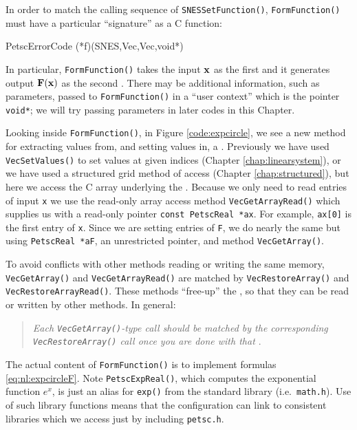 In order to match the calling sequence of \texttt{SNESSetFunction()}, \texttt{FormFunction()} must have a particular ``signature'' as a C function:
\begin{code}
PetscErrorCode (*f)(SNES,Vec,Vec,void*)
\end{code}
In particular, \texttt{FormFunction()} takes the input $\mathbf{x}$ as the first \pVec and it generates output $\mathbf{F}(\mathbf{x})$ as the second \pVec.  There may be additional information, such as parameters, passed to \texttt{FormFunction()} in a ``user context'' which is the pointer \texttt{void*}; we will try passing parameters in later codes in this Chapter.

Looking inside \texttt{FormFunction()}, in Figure \ref{code:expcircle}, we see a new method for extracting values from, and setting values in, a \pVec.  Previously we have used \texttt{VecSetValues()} to set values at given indices (Chapter \ref{chap:linearsystem}), or we have used a \pDMDA structured grid method of access (Chapter \ref{chap:structured}), but here we access the C array underlying the \pVec.  Because we only need to read entries of input \pVec \texttt{x} we use the read-only array access method \texttt{VecGetArrayRead()} which supplies us with a read-only pointer \texttt{const PetscReal *ax}.  For example, \texttt{ax[0]} is the first entry of \pVec \texttt{x}.  Since we are setting entries of \pVec \texttt{F}, we do nearly the same but using \texttt{PetscReal *aF}, an unrestricted pointer, and method \texttt{VecGetArray()}.

To avoid conflicts with other methods reading or writing the same memory, \texttt{VecGetArray()} and \texttt{VecGetArrayRead()} are matched by \texttt{VecRestoreArray()} and \texttt{VecRestoreArrayRead()}.  These methods ``free-up''  the \pVecs, so that they can be read or written by other methods.  In general:
\begin{quote}
\emph{Each \emph{\texttt{VecGetArray()}}-type call should be matched by the corresponding \emph{\texttt{VecRestoreArray()}} call once you are done with that \emph{\pVec}}.
\end{quote}

The actual content of \texttt{FormFunction()} is to implement formulas \eqref{eq:nl:expcircleF}.  Note \texttt{PetscExpReal()}, which computes the exponential function $e^x$, is just an alias for \texttt{exp()} from the standard library (i.e.~\texttt{math.h}).  Use of such \PETSc library functions means that the \PETSc configuration can link to consistent libraries which we access just by including \texttt{petsc.h}.

